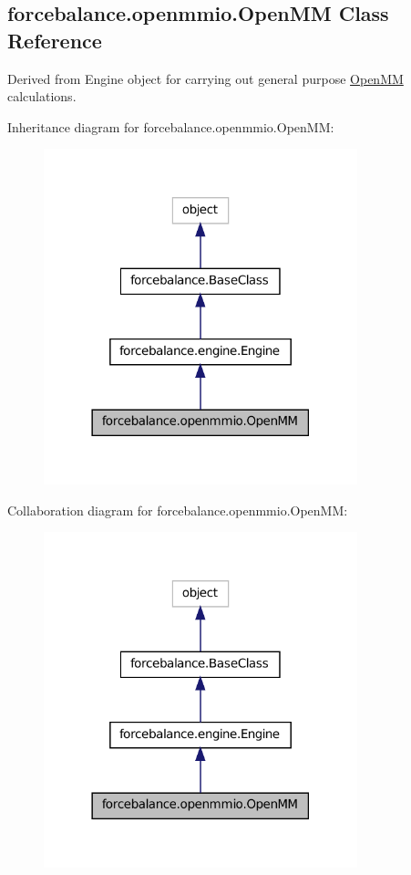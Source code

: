 \hypertarget{classforcebalance_1_1openmmio_1_1OpenMM}{\subsection{forcebalance.\-openmmio.\-Open\-M\-M Class Reference}
\label{classforcebalance_1_1openmmio_1_1OpenMM}
}


Derived from Engine object for carrying out general purpose \hyperlink{classforcebalance_1_1openmmio_1_1OpenMM}{Open\-M\-M} calculations.  




Inheritance diagram for forcebalance.\-openmmio.\-Open\-M\-M\-:
\nopagebreak
\begin{figure}[H]
\begin{center}
\leavevmode
\includegraphics[width=258pt]{classforcebalance_1_1openmmio_1_1OpenMM__inherit__graph}
\end{center}
\end{figure}


Collaboration diagram for forcebalance.\-openmmio.\-Open\-M\-M\-:
\nopagebreak
\begin{figure}[H]
\begin{center}
\leavevmode
\includegraphics[width=258pt]{classforcebalance_1_1openmmio_1_1OpenMM__coll__graph}
\end{center}
\end{figure}
